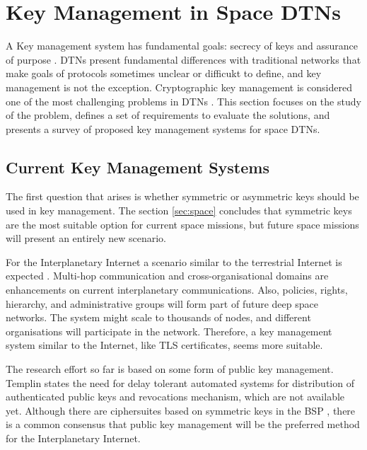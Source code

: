 \section{Key Management in Space DTNs}
\label{sec:survey}

A Key management system has fundamental goals: secrecy of keys and assurance of purpose \cite{martineveryday}.  DTNs present fundamental differences with traditional networks that make goals of protocols sometimes unclear or difficukt to define, and key management is not the exception. Cryptographic key management is considered one of the most challenging problems in DTNs \cite{menesidou2016automated,menesidou2017cryptographic,ivancic2009security,asokan2007towards}. This section focuses on the study of the problem, defines a set of requirements to evaluate the solutions, and presents a survey of proposed key management systems for space DTNs.


\subsection{Current Key Management Systems}


The first question that arises is whether symmetric or asymmetric keys should be used in key management. The section \ref{sec:space} concludes that symmetric keys are the most suitable option for current space missions, but future space missions will present an entirely new scenario.

For the Interplanetary Internet a scenario similar to the terrestrial Internet is expected \cite{rationale2010requirements}. Multi-hop communication and cross-organisational domains are enhancements on current interplanetary communications. Also, policies, rights, hierarchy, and administrative groups will form part of future deep space networks. The system might scale to thousands of nodes, and different organisations will participate in the network. Therefore, a key management system similar to the Internet, like TLS certificates, seems more suitable. 

The research effort so far is based on some form of public key management. Templin \cite{templin-dtnskmps-00} states the need for delay tolerant automated systems for distribution of authenticated public keys and revocations mechanism, which are not available yet. Although there are ciphersuites based on symmetric keys in the BSP \cite{ietf-dtn-bpsec-07}, there is a common consensus that public key management will be the preferred method for the Interplanetary Internet. 

